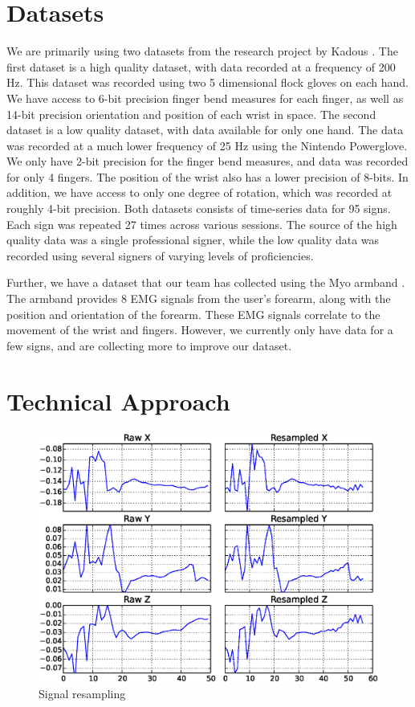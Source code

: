 \documentclass[twocolumn]{article}
\begin{document}
\section{Datasets}
We are primarily using two datasets from the research project by Kadous \cite{kadous2002temporal}. The first dataset is a high quality dataset, with data recorded at a frequency of 200 Hz. This dataset was recorded using two 5 dimensional flock gloves on each hand. We have access to 6-bit precision finger bend measures for each finger, as well as 14-bit precision orientation and position of each wrist in space. The second dataset is a low quality dataset, with data available for only one hand. The data was recorded at a much lower frequency of 25 Hz using the Nintendo Powerglove. We only have 2-bit precision for the finger bend measures, and data was recorded for only 4 fingers. The position of the wrist also has a lower precision of 8-bits. In addition, we have access to only one degree of rotation, which was recorded at roughly 4-bit precision. Both datasets consists of time-series data for 95 signs. Each sign was repeated 27 times across various sessions. The source of the high quality data was a single professional signer, while the low quality data was recorded using several signers of varying levels of proficiencies. 

Further, we have a dataset that our team has collected using the Myo armband \cite{myo}. The armband provides 8 EMG signals from the user's forearm, along with the position and orientation of the forearm. These EMG signals correlate to the movement of the wrist and fingers. However, we currently only have data for a few signs, and are collecting more to improve our dataset.

\section{Technical Approach}
\begin{figure}
\centering
\includegraphics[width=\linewidth]{results/resampled_signal}
\caption{Signal resampling}
\label{fig:resample}
\end{figure}
\end{document}
